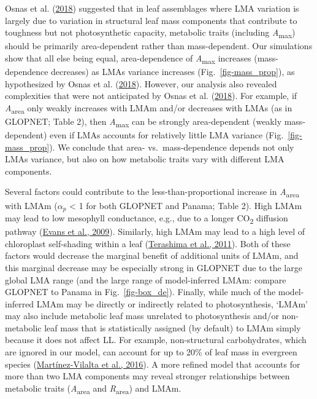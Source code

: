 \documentclass[
  12pt,
  letterpaper,
  DIV=11,
  numbers=noendperiod]{scrartcl}
\begin{document}
Osnas et al. (\protect\hyperlink{ref-Osnas2018}{2018}) suggested that in
leaf assemblages where LMA variation is largely due to variation in
structural leaf mass components that contribute to toughness but not
photosynthetic capacity, metabolic traits (including
\emph{A}\textsubscript{max}) should be primarily area-dependent rather
than mass-dependent. Our simulations show that all else being equal,
area-dependence of \emph{A}\textsubscript{max} increases
(mass-dependence decreases) as LMAs variance increases
(Fig.~\ref{fig-mass_prop}), as hypothesized by Osnas et al.
(\protect\hyperlink{ref-Osnas2018}{2018}). However, our analysis also
revealed complexities that were not anticipated by Osnas et al.
(\protect\hyperlink{ref-Osnas2018}{2018}). For example, if
\emph{A}\textsubscript{area} only weakly increases with LMAm and/or
decreases with LMAs (as in GLOPNET; Table 2), then
\emph{A}\textsubscript{max} can be strongly area-dependent (weakly
mass-dependent) even if LMAs accounts for relatively little LMA variance
(Fig.~\ref{fig-mass_prop}). We conclude that area- vs.~mass-dependence
depends not only LMAs variance, but also on how metabolic traits vary
with different LMA components.

Several factors could contribute to the less-than-proportional increase
in \emph{A}\textsubscript{area} with LMAm (\(\alpha_p\) \textless{} 1
for both GLOPNET and Panama; Table 2). High LMAm may lead to low
mesophyll conductance, e.g., due to a longer CO\textsubscript{2}
diffusion pathway (\protect\hyperlink{ref-Evans2009}{Evans et al.,
2009}). Similarly, high LMAm may lead to a high level of chloroplast
self-shading within a leaf
(\protect\hyperlink{ref-Terashima2011}{Terashima et al., 2011}). Both of
these factors would decrease the marginal benefit of additional units of
LMAm, and this marginal decrease may be especially strong in GLOPNET due
to the large global LMA range (and the large range of model-inferred
LMAm: compare GLOPNET to Panama in Fig.~\ref{fig-box_de}). Finally,
while much of the model-inferred LMAm may be directly or indirectly
related to photosynthesis, `LMAm' may also include metabolic leaf mass
unrelated to photosynthesis and/or non-metabolic leaf mass that is
statistically assigned (by default) to LMAm simply because it does not
affect LL. For example, non-structural carbohydrates, which are ignored
in our model, can account for up to 20\% of leaf mass in evergreen
species (\protect\hyperlink{ref-Martinez-Vilalta2016}{Martínez-Vilalta
et al., 2016}). A more refined model that accounts for more than two LMA
components may reveal stronger relationships between metabolic traits
(\emph{A}\textsubscript{area} and \emph{R}\textsubscript{area}) and
LMAm.
\end{document}
